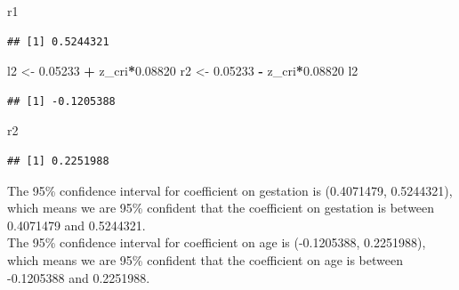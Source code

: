 \documentclass[]{article}
\newenvironment{Shaded}{\begin{snugshade}}{\end{snugshade}}
\newcommand{\FloatTok}[1]{\textcolor[rgb]{0.00,0.00,0.81}{#1}}
\newcommand{\NormalTok}[1]{#1}
\newcommand{\OperatorTok}[1]{\textcolor[rgb]{0.81,0.36,0.00}{\textbf{#1}}}
\newcommand{\StringTok}[1]{\textcolor[rgb]{0.31,0.60,0.02}{#1}}
\begin{document}
\begin{Shaded}
\begin{Highlighting}[]
\NormalTok{r1}
\end{Highlighting}
\end{Shaded}

\begin{verbatim}
## [1] 0.5244321
\end{verbatim}

\begin{Shaded}
\begin{Highlighting}[]
\NormalTok{l2 <-}\StringTok{ }\FloatTok{0.05233} \OperatorTok{+}\StringTok{ }\NormalTok{z_cri}\OperatorTok{*}\FloatTok{0.08820}
\NormalTok{r2 <-}\StringTok{ }\FloatTok{0.05233} \OperatorTok{-}\StringTok{ }\NormalTok{z_cri}\OperatorTok{*}\FloatTok{0.08820}
\NormalTok{l2}
\end{Highlighting}
\end{Shaded}

\begin{verbatim}
## [1] -0.1205388
\end{verbatim}

\begin{Shaded}
\begin{Highlighting}[]
\NormalTok{r2}
\end{Highlighting}
\end{Shaded}

\begin{verbatim}
## [1] 0.2251988
\end{verbatim}

The 95\% confidence interval for coefficient on gestation is (0.4071479,
0.5244321), which means we are 95\% confident that the coefficient on
gestation is between 0.4071479 and 0.5244321.\\
The 95\% confidence interval for coefficient on age is (-0.1205388,
0.2251988), which means we are 95\% confident that the coefficient on
age is between -0.1205388 and 0.2251988.
\end{document}
